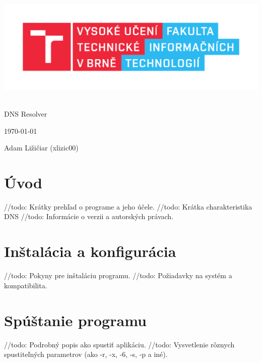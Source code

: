 \documentclass[a4paper, 11pt]{article}
\begin{document}
	\begin{titlepage}
		\begin{center}
			\includegraphics[width=0.77\linewidth]{res/logo_FIT.pdf} \\


			 \\
			\LARGE{DNS Resolver} \\
		\end{center}

		\begin{minipage}[b]{0.4 \textwidth}
			\raggedright
			{\Large \today}
		\end{minipage}
		\hfill
		\begin{minipage}[b]{0.6 \textwidth}
			\raggedleft
			\Large
			Adam Ližičiar (xlizic00)\\
		\end{minipage}		
	\end{titlepage}

	\setcounter{page}{1}
	\tableofcontents
	\clearpage

	\setcounter{page}{1}
	
	\section{Úvod}
	//todo: Krátky prehľad o programe a jeho účele.
	//todo: Krátka charakteristika DNS
	//todo: Informácie o verzii a autorských právach.

	\section{Inštalácia a konfigurácia}
	//todo: Pokyny pre inštaláciu programu.
	//todo: Požiadavky na systém a kompatibilita.
	
	\section{Spúštanie programu}
	//todo: Podrobný popis ako spustiť aplikáciu.
	//todo: Vysvetlenie rôznych spustiteľných parametrov (ako -r, -x, -6, -s, -p a iné).
\end{document}
